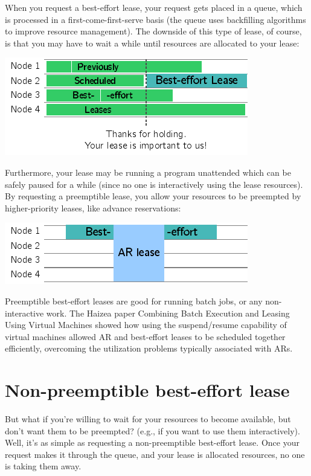 When you request a best-effort lease, your request gets placed in a queue, which is processed in a first-come-first-serve basis (the queue uses backfilling algorithms to improve resource management). The downside of this type of lease, of course, is that you may have to wait a while until resources are allocated to your lease:

\begin{center}
\includegraphics{images/lease_be2.png}
\end{center}

Furthermore, your lease may be running a program unattended which can be safely paused for a while (since no one is interactively using the lease resources). By requesting a preemptible lease, you allow your resources to be preempted by higher-priority leases, like advance reservations:

\begin{center}
\includegraphics{images/lease_be3.png}
\end{center}

Preemptible best-effort leases are good for running batch jobs, or any non-interactive work. The Haizea paper Combining Batch Execution and Leasing Using Virtual Machines showed how using the suspend/resume capability of virtual machines allowed AR and best-effort leases to be scheduled together efficiently, overcoming the utilization problems typically associated with ARs.

\section{Non-preemptible best-effort lease}

But what if you're willing to wait for your resources to become available, but don't want them to be preempted? (e.g., if you want to use them interactively). Well, it's as simple as requesting a non-preemptible best-effort lease. Once your request makes it through the queue, and your lease is allocated resources, no one is taking them away.

